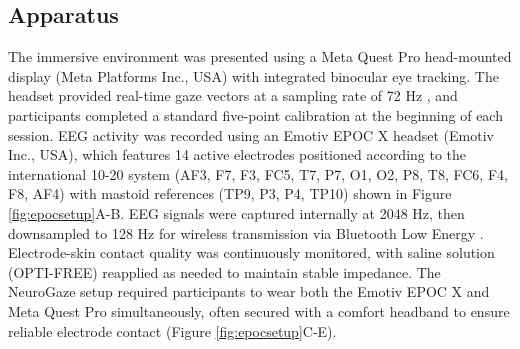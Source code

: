 \documentclass[utf8]{FrontiersinHarvard} %
\begin{document}

\subsection{Apparatus}
The immersive environment was presented using a Meta Quest Pro head-mounted display (Meta Platforms Inc., USA) with integrated binocular eye tracking. The headset provided real-time gaze vectors at a sampling rate of 72 Hz \citep{hou}, and participants completed a standard five-point calibration at the beginning of each session. EEG activity was recorded using an Emotiv EPOC X headset (Emotiv Inc., USA), which features 14 active electrodes positioned according to the international 10-20 system \citep{khazi2012eeg} (AF3, F7, F3, FC5, T7, P7, O1, O2, P8, T8, FC6, F4, F8, AF4) with mastoid references (TP9, P3, P4, TP10) shown in Figure \ref{fig:epocsetup}A-B. EEG signals were captured internally at 2048 Hz, then downsampled to 128 Hz for wireless transmission via Bluetooth Low Energy \citep{emotiv2020epocx}. Electrode-skin contact quality was continuously monitored, with saline solution (OPTI-FREE) reapplied as needed to maintain stable impedance. The NeuroGaze setup required participants to wear both the Emotiv EPOC X and Meta Quest Pro simultaneously, often secured with a comfort headband to ensure reliable electrode contact (Figure \ref{fig:epocsetup}C-E).
\end{document}
